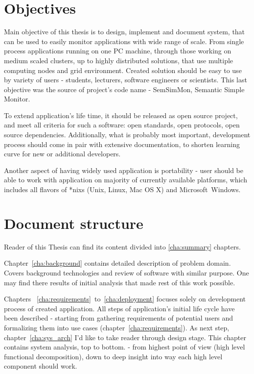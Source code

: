 \section{Objectives}
\label{ch1:Objectives}

Main objective of this thesis is to design, implement and document system, that can be used to easily monitor applications with wide range of scale. From single process applications running on one PC machine, through those working on medium scaled clusters, up to highly distributed solutions, that use multiple computing nodes and grid environment. Created solution should be easy to use by variety of users - students, lecturers, software engineers or scientists. This last objective was the source of project's code name - SemSimMon, Semantic Simple Monitor. 

To extend application's life time, it should be released as open source project, and meet all criteria for such a software: open standards, open protocols, open source dependencies. Additionally, what is probably most important, development process should come in pair with extensive documentation, to shorten learning curve for new or additional developers.

Another aspect of having widely used application is portability - user should be able to work with application on majority of currently available platforms, which includes all flavors of *nixs (Unix, Linux, Mac OS X\textregistered) and Microsoft\textregistered~Windows\textregistered. 


\section{Document structure}
\label{ch1:docStructure}

Reader of this Thesis can find its content divided into \ref{cha:summary} chapters. 

Chapter~\ref{cha:background} contains detailed description of problem domain. Covers background technologies and review
of software
with similar purpose. One may find there results of initial analysis that made rest of this work possible.

Chapters ~\ref{cha:requirements}~to~\ref{cha:deployment} focuses solely on development process of created application. All steps of application's initial life cycle have been described - starting from gathering requirements of potential users and formalizing them into use cases (chapter~\ref{cha:requirements}). As next step, chapter~\ref{cha:sys_arch} I'd like to take reader through design stage. This chapter contains system analysis, top to bottom. - from highest point of view (high level functional decomposition), down to deep insight into way each high level component should work. 

